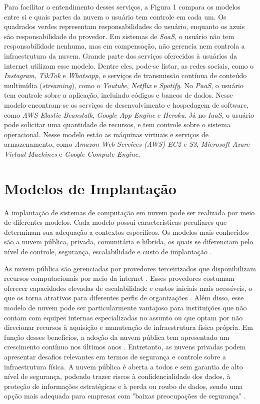 Para facilitar o entendimento desses serviços, a Figura 1 compara os modelos entre si e quais partes da nuvem o usuário tem controle em cada um. Os quadrados verdes representam responsabilidades do usuário, enquanto os azuis são responsabilidade do provedor. Em sistemas de \textit{SaaS}, o usuário não tem responsabilidade nenhuma, mas em compensação, não gerencia nem controla a infraestrutura da nuvem. Grande parte dos serviços oferecidos à usuários da internet utilizam esse modelo. Dentre eles, pode-se listar, as redes sociais, como o \textit{Instagram}, \textit{TikTok} e \textit{Whatsapp}, e serviços de transmissão contínua de conteúdo multimídia (\textit{streaming}), como o \textit{Youtube}, \textit{Netflix} e \textit{Spotify}.  No \textit{PaaS}, o usuário tem controle sobre a aplicação, incluindo códigos e bancos de dados. Nesse modelo encontram-se os serviços de desenvolvimento e hospedagem de software, como \textit{AWS Elastic Beanstalk}, \textit{Google App Engine} e \textit{Heroku}. Já no \textit{IaaS}, o usuário pode solicitar uma quantidade de recursos, e tem controle sobre o sistema operacional. Nesse modelo estão as máquinas virtuais e serviços de armazenamento, como  \textit{Amazon Web Services (AWS) EC2 e S3},  \textit{Microsoft Azure Virtual Machines} e  \textit{Google Compute Engine}.

\section{Modelos de Implantação}
A implantação de sistemas de computação em nuvem pode ser realizada por meio de diferentes modelos. Cada modelo possui características peculiares que determinam sua adequação a contextos específicos. Os modelos mais conhecidos são a nuvem pública, privada, comunitária e híbrida, os quais se diferenciam pelo nível de controle, segurança, escalabilidade e custo de implantação \cite{mell2011}.

As nuvem pública são gerenciadas por provedores terceirizados que disponibilizam recursos computacionais por meio da internet \cite{carroll2011}. Esses provedores costumam oferecer capacidades elevadas de escalabilidade e custos iniciais mais acessíveis, o que os torna atrativos para diferentes perfis de organizações \cite{amajuoyi2024}. Além disso, esse modelo de nuvem pode ser particularmente vantajoso para instituições que não contam com equipes internas especializadas no assunto ou que optam por não direcionar recursos à aquisição e manutenção de infraestrutura física própria. Em função desses benefícios, a adoção da nuvem pública tem apresentado um crescimento contínuo nos últimos anos \cite{amajuoyi2024}. Entretanto, as nuvens privadas podem apresentar desafios relevantes em termos de segurança e controle sobre a infraestrutura física. A nuvem pública é aberta a todos e sem garantia de alto nível de segurança, podendo trazer riscos à confidencialidade dos dados, à proteção de informações estratégicas e à perda ou roubo de dados, sendo uma opção mais adequada para empresas com "baixas preocupações de segurança" \cite{sathya2023}.


